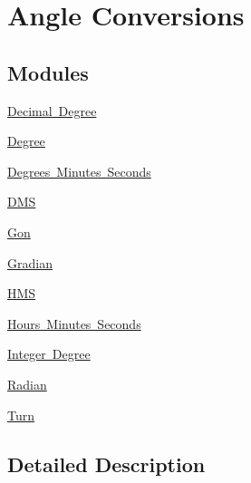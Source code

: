 \hypertarget{group___e_g_x_math-_angle_conversions}{}\section{Angle Conversions}
\label{group___e_g_x_math-_angle_conversions}
\subsection*{Modules}
\begin{DoxyCompactItemize}
\item 
\mbox{\hyperlink{group___e_g_x_math-_angle_conversions-_decimal_degree}{Decimal Degree}}
\item 
\mbox{\hyperlink{group___e_g_x_math-_angle_conversions-_degree}{Degree}}
\item 
\mbox{\hyperlink{group___e_g_x_math-_angle_conversions-_degrees_minutes_seconds}{Degrees Minutes Seconds}}
\item 
\mbox{\hyperlink{group___e_g_x_math-_angle_conversions-_d_m_s}{D\+MS}}
\item 
\mbox{\hyperlink{group___e_g_x_math-_angle_conversions-_gon}{Gon}}
\item 
\mbox{\hyperlink{group___e_g_x_math-_angle_conversions-_gradian}{Gradian}}
\item 
\mbox{\hyperlink{group___e_g_x_math-_angle_conversions-_h_m_s}{H\+MS}}
\item 
\mbox{\hyperlink{group___e_g_x_math-_angle_conversions-_hours_minutes_seconds}{Hours Minutes Seconds}}
\item 
\mbox{\hyperlink{group___e_g_x_math-_angle_conversions-_integer_degree}{Integer Degree}}
\item 
\mbox{\hyperlink{group___e_g_x_math-_angle_conversions-_radian}{Radian}}
\item 
\mbox{\hyperlink{group___e_g_x_math-_angle_conversions-_turn}{Turn}}
\end{DoxyCompactItemize}


\subsection{Detailed Description}
